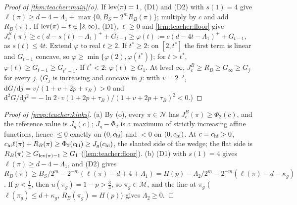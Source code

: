 \begin{proof}[Proof of \cref{thm:teacher:main}(o)]
If $\operatorname{lev}(\pi)=1$, (D1) and (D2) with $s(1)=4$ give $\ell(\pi)\ge d-4-\Lambda_1+\max\{0,B_S-2^mR_B(\pi)\}$; multiply by $c$ and add $R_B(\pi)$. If $\operatorname{lev}(\pi)=t\in[2,\infty)$, (D1), $\ell\ge0$ and \cref{lem:teacher:floor} give $J^B_c(\pi)\ge c(d-s(t)-\Lambda_1)^++G_{t-1}\ge\varphi(t):=c(d-4t-\Lambda_1)^++G_{t-1}$, as $s(t)\le4t$. Extend $\varphi$ to real $t\ge2$. If $t^*\ge2$: on $[2,t^*]$ the first term is linear and $G_{t-1}$ concave, so $\varphi\ge\min\{\varphi(2),\varphi(t^*)\}$; for $t>t^*$, $\varphi(t)\ge G_{t-1}\ge G_{t^*-1}$. If $t^*<2$: $\varphi(t)\ge G_1$. At level $\infty$, $J^B_c\ge R_B\ge G_\infty\ge G_j$ for every $j$. ($G_j$ is increasing and concave in $j$: with $v=2^{-j}$, $\mathrm dG/\mathrm dj=v/(1+v+2p+\tau_B)>0$ and $\mathrm d^2G/\mathrm dj^2=-\ln2\cdot v(1+2p+\tau_B)/(1+v+2p+\tau_B)^2<0$.)
\end{proof}

\begin{proof}[Proof of \cref{prop:teacher:kinks}]
(a) By (o), every $\pi\in\mathcal N$ has $J^B_c(\pi)\ge\Phi_2(c)$, and the reference value is $J_g(c)$; $J_g-\Phi_2$ is a maximum of strictly increasing affine functions, hence $\le0$ exactly on $(0,c_{\rm hi}]$ and $<0$ on $(0,c_{\rm hi})$. At $c=c_{\rm hi}>0$, $c_{\rm hi}\ell(\pi)+R_B(\pi)\ge\Phi_2(c_{\rm hi})\ge J_g(c_{\rm hi})$, the slanted side of the wedge; the flat side is $R_B(\pi)\ge G_{\operatorname{lev}(\pi)-1}\ge G_1$ (\cref{lem:teacher:floor}).
(b) (D1) with $s(1)=4$ gives $\ell(\pi)\ge d-4-\Lambda_1$, and (D2) gives $R_B(\pi)\ge B_S/2^m-2^{-m}(\ell(\pi)-d+4+\Lambda_1)=H(p)-\Lambda_2/2^m-2^{-m}(\ell(\pi)-d-\kappa_g)$. If $p<\frac14$, then $u(\pi_g)=1-p>\frac34$, so $\pi_g\in\mathcal M$, and the line at $\pi_g$ ($\ell(\pi_g)\le d+\kappa_g$, $R_B(\pi_g)=H(p)$) gives $\Lambda_2\ge0$.
\end{proof}

